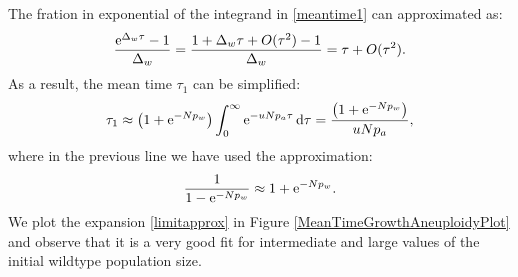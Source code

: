 \documentclass[12pt]{extarticle}
\renewcommand{\d}{{\rm d}}
\newcommand{\e}{{\rm e}}
\begin{document}
The fration in exponential of the integrand in \eqref{meantime1} can approximated as:
\begin{equation*}
\frac{\e^{\Delta_w\tau}-1}{\Delta_w}=\frac{1+\Delta_w\tau+O(\tau^2)-1}{\Delta_w}=\tau+O(\tau^2).
\end{equation*}
As a result, the mean time $\tau_1$ can be simplified:
\begin{align}\label{limitapprox}
\tau_1\approx\left(1+\e^{-Np_w}\right)\int_0^\infty\e^{-uNp_a\tau}\,\d\tau=\frac{\left(1+\e^{-Np_w}\right)}{uNp_a},
\end{align}
where in the previous line we have used the approximation:
\begin{equation*}
\frac{1}{1-\e^{-Np_w}}\approx1+\e^{-Np_w}.
\end{equation*}
We plot the expansion \eqref{limitapprox} in Figure \ref{MeanTimeGrowthAneuploidyPlot} and observe that it is a very good fit for intermediate and large values of the initial wildtype population size.
\end{document}
